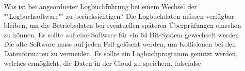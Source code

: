     {Was ist bei angeordneter Logbuchführung bei einem Wechsel der ""Logbuchsoftware"" zu berücksichtigen?}
    {Die Logbuchdaten müssen verfügbar bleiben, um die Betriebsdaten bei eventuellen späteren Überprüfungen einsehen zu können.}
    {Es sollte auf eine Software für ein 64 Bit-System gewechselt werden.}
    {Die alte Software muss auf jeden Fall gelöscht werden, um Kollisionen bei den Datenformaten zu vermeiden.}
    {Es sollte ein Logbuchprogramm genutzt werden, welches ermöglicht, die Daten in der Cloud zu speichern.}
    {false}{false}